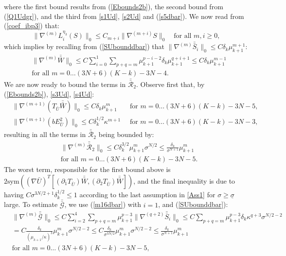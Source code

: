 \documentclass[reqno,twoside,11pt]{amsart}
\newcommand{\sym}{\mathrm{sym}}
\newcommand*{\dbar}[1]{\bar{\bar{#1}}}
\numberwithin{equation}{section}
\theoremstyle{plain}
\theoremstyle{definition}
\begin{document}
where the first bound results from (\ref{Ebounds2b}), the second bound
from (\ref{Q1Udgr}), and the third from \ref{s1Ud}, \ref{s2Ud} and (\ref{s5dbar}). 
We now read from (\ref{coef_ibp3}) that:
\begin{equation}\label{m16dbar}
\|\nabla^{(m)}L_i^{\eta_3}(S)\|_0\leq
C_{m+i}\|\nabla^{(m+i)}S\|_0\quad\mbox{for all } m,i\geq 0,
\end{equation}
which implies by recalling from (\ref{SUbounddbar}) that
$\|\nabla^{(m)}\dbar S_i\|_0 \leq C\delta_k\mu_{k+1}^{m+1}$:
\begin{equation}\label{m14dbar}
\begin{split}
& \|\nabla^{(m)}\dbar W\|_0  \leq C\sum_{i=0}^1
\sum_{p+q=m} \mu_{k+1}^{p-i-2}\delta_{k}\mu_{k+1}^{q+i+1} \leq C
\delta_k\mu_{k+1}^{m-1} \\ & \mbox{for all } m=0\ldots (3N+6)(K-k)-3N-4.
\end{split}
\end{equation}
We are now ready to bound the terms in $\dbar{\mathcal{R}}_2$. Observe first
that, by (\ref{Ebounds2b}), \ref{s3Ud}, \ref{s4Ud}:
\begin{equation*}
\begin{split}
&\|\nabla^{(m+1)}(T_{\bar U}\dbar W)\|_0\leq C\delta_k\mu_{k+1}^m
\quad \;\;\mbox{ for } m=0\ldots (3N+6)(K-k)-3N-5,
\\ & \|\nabla^{(m+1)}(bE^2_{\bar U})\|_0\leq C\delta_k^{1/2}\kappa^{m+1}
\quad \mbox{ for } m=0\ldots (3N+6)(K-k)-3N-3,
\end{split}
\end{equation*}
resulting in all the terms in $\dbar{\mathcal{R}}_2$ being bounded by:
\begin{equation}\label{m15dbar}
\begin{split}
& \|\nabla^{(m)}\dbar{\mathcal{R}}_2\|_0\leq
C\delta_k^{3/2}\mu_{k+1}^{m} \sigma^{N/2}
\leq \frac{\delta_k}{\sigma^{N+1}}\mu_{k+1}^m\\ & \mbox{for all } m=0\ldots (3N+6)(K-k)-3N-5.
\end{split}
\end{equation}
The worst term, responsible for the first bound above is
$2\sym((\nabla \bar U)^T[(\partial_1T_{\bar U})\dbar W, (\partial_2T_{\bar U})\dbar W])$,
and the final inequality is due to having 
$C\sigma^{3N/2+1}\delta_k^{1/2}\leq 1$ 
according to the last assumption in \ref{Ass1} for
$\sigma\geq\underline\sigma$ large. To estimate $\dbar{\mathcal{G}}$,
we use (\ref{m16dbar}) with $i=1$, and (\ref{SUbounddbar}):
\begin{equation}\label{m17dbar}
\begin{split}
& \|\nabla^{(m)}\dbar{\mathcal{G}}\|_0 \leq
C \sum_{i=2}^4\sum_{p+q=m} \mu_{k+1}^{p-3} \|\nabla^{(q+2)} \dbar S_i\|_0
\leq C \sum_{p+q=m} \mu_{k+1}^{p-3}\delta_k\kappa^{q+3}\sigma^{N/2-2}
\\ & = C\frac{\delta_k}{(\mu_{k+1}/\kappa)^3}\mu_{k+1}^m\sigma^{N/2-2}
\leq C \frac{\delta_k}{\sigma^{3N/2}}\mu_{k+1}^m\sigma^{N/2-2}\leq 
\frac{\delta_k}{\sigma^{N+1}}\mu_{k+1}^m
\\ & \mbox{for all } m=0\ldots (3N+6)(K-k)-3N-5,
\end{split}
\end{equation}
\end{document}
